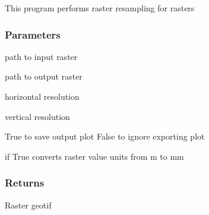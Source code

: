 \documentclass[letterpaper,10pt]{sphinxmanual}
\begin{document}
\begin{fulllineitems}
\label{\detokenize{generated/akhdefo_functions.Akhdefo_resample:akhdefo_functions.Akhdefo_resample}}
\pysigstartsignatures
{}
\pysigstopsignatures
\sphinxAtStartPar
This program performs raster resampling for  rasters


\subsubsection{Parameters}
\label{\detokenize{generated/akhdefo_functions.Akhdefo_resample:parameters}}\begin{description}
\sphinxAtStartPar
path to input raster

\sphinxAtStartPar
path to output raster

\sphinxAtStartPar
horizontal resolution

\sphinxAtStartPar
vertical resolution

\sphinxAtStartPar
True to save output plot False to ignore exporting plot

\sphinxAtStartPar
if True converts raster value units from m to mm

\end{description}


\subsubsection{Returns}
\label{\detokenize{generated/akhdefo_functions.Akhdefo_resample:returns}}
\sphinxAtStartPar
Raster geotif

\end{fulllineitems}


\sphinxstepscope
\end{document}
